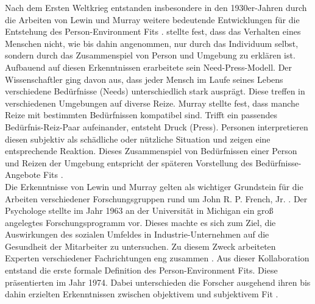 Nach dem Ersten Weltkrieg entstanden insbesondere in den 1930er-Jahren durch die Arbeiten von Lewin und Murray weitere bedeutende Entwicklungen für die Entstehung des Person-Environment Fits \cite[S. 1]{edwards:1990}. \textcite[S. 11f.]{lewin:1936} stellte fest, dass das Verhalten eines Menschen nicht, wie bis dahin angenommen, nur durch das Individuum selbst, sondern durch das Zusammenspiel von Person und Umgebung zu erklären ist. Aufbauend auf diesen Erkenntnissen erarbeitete \textcite[S. 38ff.]{murray:1938} sein Need-Press-Modell. Der Wissenschaftler ging davon aus, dass jeder Mensch im Laufe seines Lebens verschiedene Bedürfnisse (Needs) unterschiedlich stark ausprägt. Diese treffen in verschiedenen Umgebungen auf diverse Reize. Murray stellte fest, dass manche Reize mit bestimmten Bedürfnissen kompatibel sind. Trifft ein passendes Bedürfnis-Reiz-Paar aufeinander, entsteht Druck (Press). Personen interpretieren diesen subjektiv als schädliche oder nützliche Situation und zeigen eine entsprechende Reaktion. Dieses Zusammenspiel von Bedürfnissen einer Person und Reizen der Umgebung entspricht der späteren Vorstellung des Bedürfnisse-Angebote Fits \cite[S. 8]{edwards:2008}. \\
Die Erkenntnisse von Lewin und Murray gelten als wichtiger Grundstein für die Arbeiten verschiedener Forschungsgruppen rund um John R. P. French, Jr. \cite[S. 5]{caplan:1993}. Der Psychologe stellte im Jahr 1963 an der Universität in Michigan ein groß angelegtes Forschungsprogramm vor. Dieses machte es sich zum Ziel, die Auswirkungen des sozialen Umfeldes in Industrie-Unternehmen auf die Gesundheit der Mitarbeiter zu untersuchen. Zu diesem Zweck arbeiteten Experten verschiedener Fachrichtungen eng zusammen \cite[S. 1ff.]{french:1963}. Aus dieser Kollaboration entstand die erste formale Definition des Person-Environment Fits. Diese präsentierten \textcite{copingAndAdaption:1974} im Jahr 1974. Dabei unterschieden die Forscher ausgehend ihren bis dahin erzielten Erkenntnissen zwischen objektivem und subjektivem Fit \cite[S. 4f.]{caplan:1993}\cite[S. 1ff.]{french:1966}.

